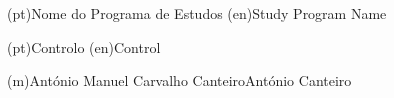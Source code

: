 \ntdegreename*(pt){Nome do Programa de Estudos}
\ntdegreename*(en){Study Program Name}



\ntspecialization*(pt){Controlo}
\ntspecialization*(en){Control}







\ntauthorname(m){António Manuel Carvalho Canteiro}{António Canteiro}



